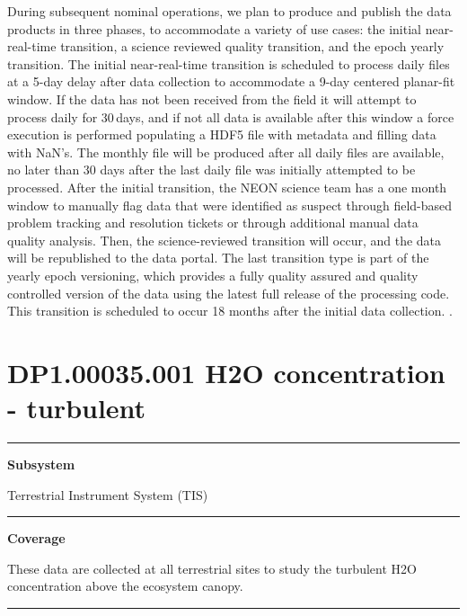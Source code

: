 \documentclass[]{article}
\begin{document}
During subsequent nominal operations, we plan to produce and publish the
data products in three phases, to accommodate a variety of use cases:
the initial near-real-time transition, a science reviewed quality
transition, and the epoch yearly transition. The initial near-real-time
transition is scheduled to process daily files at a 5-day delay after
data collection to accommodate a 9-day centered planar-fit window. If
the data has not been received from the field it will attempt to process
daily for 30\,days, and if not all data is available after this window a
force execution is performed populating a HDF5 file with metadata and
filling data with NaN's. The monthly file will be produced after all
daily files are available, no later than 30 days after the last daily
file was initially attempted to be processed. After the initial
transition, the NEON science team has a one month window to manually
flag data that were identified as suspect through field-based problem
tracking and resolution tickets or through additional manual data
quality analysis. Then, the science-reviewed transition will occur, and
the data will be republished to the data portal. The last transition
type is part of the yearly epoch versioning, which provides a fully
quality assured and quality controlled version of the data using the
latest full release of the processing code. This transition is scheduled
to occur 18 months after the initial data collection. \newpage
.

\section{DP1.00035.001 H2O concentration -
turbulent}\label{dp1.00035.001-h2o-concentration---turbulent}

\begin{center}\rule{0.5\linewidth}{\linethickness}\end{center}

\textbf{Subsystem}

Terrestrial Instrument System (TIS)

\begin{center}\rule{0.5\linewidth}{\linethickness}\end{center}

\textbf{Coverage}

These data are collected at all terrestrial sites to study the turbulent
H2O concentration above the ecosystem canopy.

\begin{center}\rule{0.5\linewidth}{\linethickness}\end{center}
\end{document}
